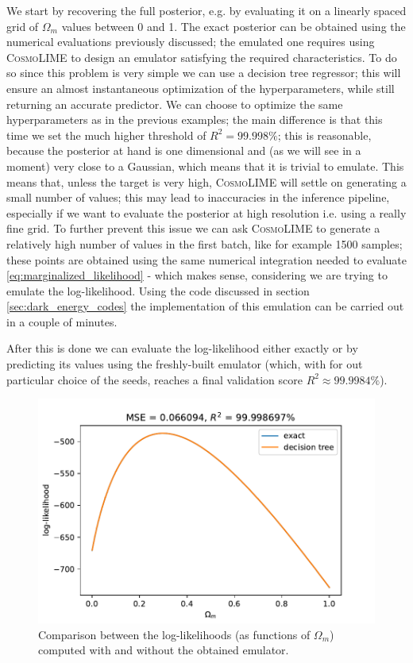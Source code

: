 We start by recovering the full posterior, e.g. by evaluating it on a linearly spaced grid of $\Omega_m$ values between 0 and 1. The exact posterior can be obtained using the numerical evaluations previously discussed; the emulated one requires using \textsc{CosmoLIME} to design an emulator satisfying the required characteristics.
To do so since this problem is very simple we can use a decision tree regressor; this will ensure an almost instantaneous optimization of the hyperparameters, while still returning an accurate predictor.
We can choose to optimize the same hyperparameters as in the previous examples; the main difference is that this time we set the much higher threshold of $R^2 = 99.998\%$; this is reasonable, because the posterior at hand is one dimensional and (as we will see in a moment) very close to a Gaussian, which means that it is trivial to emulate. This means that, unless the target is very high, \textsc{CosmoLIME} will settle on generating a small number of values; this may lead to inaccuracies in the inference pipeline, especially if we want to evaluate the posterior at high resolution i.e. using a really fine grid. To further prevent this issue we can ask \textsc{CosmoLIME} to generate a relatively high number of values in the first batch, like for example 1500 samples; these points are obtained using the same numerical integration needed to evaluate \eqref{eq:marginalized_likelihood} - which makes sense, considering we are trying to emulate the log-likelihood.
Using the code discussed in section \ref{sec:dark_energy_codes} the implementation of this emulation can be carried out in a couple of minutes.

After this is done we can evaluate the log-likelihood either exactly or by predicting its values using the freshly-built emulator (which, with for out particular choice of the seeds, reaches a final validation score $R^2\approx 99.9984\%$).

\begin{figure}[H]
    \centering
    \includegraphics[width=1.0\textwidth]{img/loglikelihood_dt.pdf}
    \caption{Comparison between the log-likelihoods (as functions of $\Omega_m$) computed with and without the obtained emulator.}
    \label{fig:loglikelihood_dt}
\end{figure}

